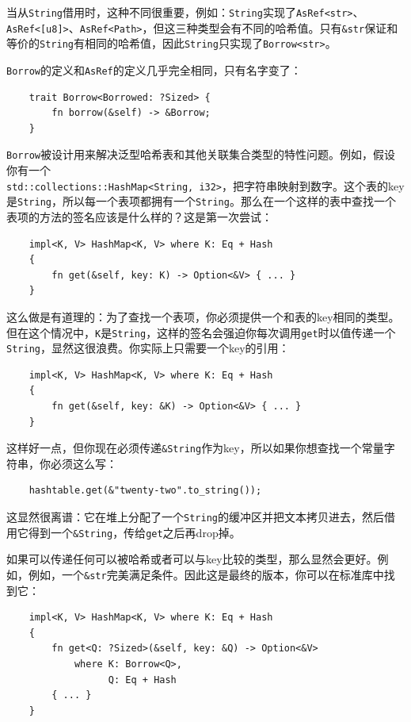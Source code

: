 当从\texttt{String}借用时，这种不同很重要，例如：\texttt{String}实现了\texttt{AsRef<str>}、\texttt{AsRef<[u8]>}、\texttt{AsRef<Path>}，但这三种类型会有不同的哈希值。只有\texttt{\&str}保证和等价的\texttt{String}有相同的哈希值，因此\texttt{String}只实现了\texttt{Borrow<str>}。

\texttt{Borrow}的定义和\texttt{AsRef}的定义几乎完全相同，只有名字变了：
\begin{verbatim}
    trait Borrow<Borrowed: ?Sized> {
        fn borrow(&self) -> &Borrow;
    }
\end{verbatim}

\texttt{Borrow}被设计用来解决泛型哈希表和其他关联集合类型的特性问题。例如，假设你有一个\\
\texttt{std::collections::HashMap<String, i32>}，把字符串映射到数字。这个表的key是\texttt{String}，所以每一个表项都拥有一个\texttt{String}。那么在一个这样的表中查找一个表项的方法的签名应该是什么样的？这是第一次尝试：
\begin{verbatim}
    impl<K, V> HashMap<K, V> where K: Eq + Hash
    {
        fn get(&self, key: K) -> Option<&V> { ... }
    }
\end{verbatim}

这么做是有道理的：为了查找一个表项，你必须提供一个和表的key相同的类型。但在这个情况中，\texttt{K}是\texttt{String}，这样的签名会强迫你每次调用\texttt{get}时以值传递一个\texttt{String}，显然这很浪费。你实际上只需要一个key的引用：
\begin{verbatim}
    impl<K, V> HashMap<K, V> where K: Eq + Hash
    {
        fn get(&self, key: &K) -> Option<&V> { ... }
    }
\end{verbatim}

这样好一点，但你现在必须传递\texttt{\&String}作为key，所以如果你想查找一个常量字符串，你必须这么写：
\begin{verbatim}
    hashtable.get(&"twenty-two".to_string());
\end{verbatim}

这显然很离谱：它在堆上分配了一个\texttt{String}的缓冲区并把文本拷贝进去，然后借用它得到一个\texttt{\&String}，传给\texttt{get}之后再drop掉。

如果可以传递任何可以被哈希或者可以与key比较的类型，那么显然会更好。例如，例如，一个\texttt{\&str}完美满足条件。因此这是最终的版本，你可以在标准库中找到它：
\begin{verbatim}
    impl<K, V> HashMap<K, V> where K: Eq + Hash
    {
        fn get<Q: ?Sized>(&self, key: &Q) -> Option<&V>
            where K: Borrow<Q>,
                  Q: Eq + Hash
        { ... }
    }
\end{verbatim}

